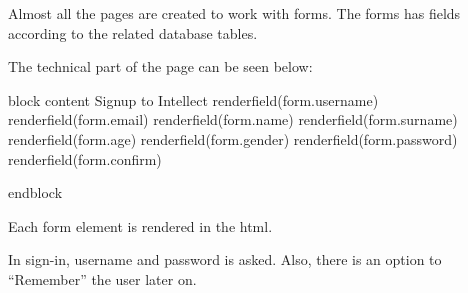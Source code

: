 \documentclass[letterpaper,10pt,english]{sphinxmanual}
\begin{document}
Almost all the pages are created to work with forms. The forms has fields according to the related database tables.

 
The technical part of the page can be seen below:

\begin{sphinxVerbatim}[commandchars=\\\{\}]
\PYGZob{}\PYGZpc{} block content \PYGZpc{}\PYGZcb{}
        Sign\PYGZhy{}up to Intellect
     
    \PYGZob{}\PYGZob{} render\PYGZus{}field(form.username) \PYGZcb{}\PYGZcb{}
    \PYGZob{}\PYGZob{} render\PYGZus{}field(form.email) \PYGZcb{}\PYGZcb{}
    \PYGZob{}\PYGZob{} render\PYGZus{}field(form.name) \PYGZcb{}\PYGZcb{}
    \PYGZob{}\PYGZob{} render\PYGZus{}field(form.surname) \PYGZcb{}\PYGZcb{}
    \PYGZob{}\PYGZob{} render\PYGZus{}field(form.age) \PYGZcb{}\PYGZcb{}
    \PYGZob{}\PYGZob{} render\PYGZus{}field(form.gender) \PYGZcb{}\PYGZcb{}
    \PYGZob{}\PYGZob{} render\PYGZus{}field(form.password) \PYGZcb{}\PYGZcb{}
    \PYGZob{}\PYGZob{} render\PYGZus{}field(form.confirm) \PYGZcb{}\PYGZcb{}
    

\PYGZob{}\PYGZpc{} endblock \PYGZpc{}\PYGZcb{}
\end{sphinxVerbatim}

Each form element is rendered in the html.

 
In sign-in,  username and password is asked. Also, there is an option to “Remember” the user later on.
\end{document}
